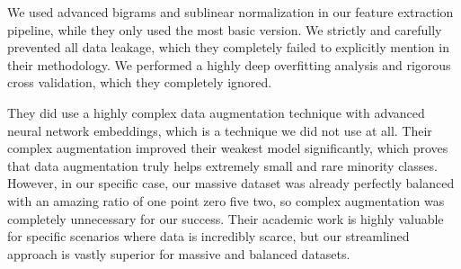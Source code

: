 \documentclass[12pt]{article}
\begin{document}
We used advanced bigrams and sublinear normalization in our feature extraction pipeline, while they only used the most basic version. We strictly and carefully prevented all data leakage, which they completely failed to explicitly mention in their methodology. We performed a highly deep overfitting analysis and rigorous cross validation, which they completely ignored. 

They did use a highly complex data augmentation technique with advanced neural network embeddings, which is a technique we did not use at all. Their complex augmentation improved their weakest model significantly, which proves that data augmentation truly helps extremely small and rare minority classes. However, in our specific case, our massive dataset was already perfectly balanced with an amazing ratio of one point zero five two, so complex augmentation was completely unnecessary for our success. Their academic work is highly valuable for specific scenarios where data is incredibly scarce, but our streamlined approach is vastly superior for massive and balanced datasets.
\end{document}
